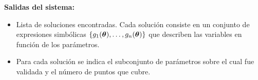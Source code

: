 \documentclass[12pt,a4paper]{article} \usepackage[utf8]{inputenc} \usepackage[spanish]{babel} \usepackage{amsmath, amssymb, amsthm} \usepackage{bm} \usepackage{float} \usepackage{longtable} \usepackage[hidelinks]{hyperref}
\begin{document}
\textbf{Salidas del sistema:}
\begin{itemize}
    \item Lista de soluciones encontradas. Cada solución consiste en un
    conjunto de expresiones simbólicas
    \(\{g_1(\boldsymbol{\theta}), \dots, g_n(\boldsymbol{\theta})\}\) que describen las
    variables en función de los parámetros.
    \item Para cada solución se indica el subconjunto de parámetros
    sobre el cual fue validada y el número de puntos que cubre.
\end{itemize}


\newpage  
\end{document}

